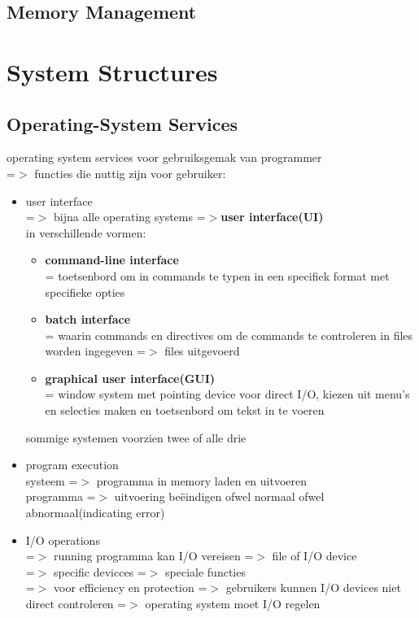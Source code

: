 \documentclass{report}
\begin{document}
\section{Memory Management}


\chapter{System Structures}
\section{Operating-System Services}
operating system services voor gebruiksgemak van programmer
\\=$>$ functies die nuttig zijn voor gebruiker:
\begin{itemize}
\item user interface
\\ =$>$ bijna alle operating systems =$>$\textbf{user interface(UI)}
\\in verschillende vormen:
\begin{itemize}
\item \textbf{command-line interface}
\\= toetsenbord om in commands te typen in een specifiek format met specifieke opties
\item \textbf{batch interface}
\\= waarin commands en directives om de commands te controleren in files worden ingegeven =$>$ files uitgevoerd
\item \textbf{graphical user interface(GUI)}
\\= window system met pointing device voor direct I/O, kiezen uit menu's en selecties maken en toetsenbord om tekst in te voeren
\end{itemize}
sommige systemen voorzien twee of alle drie
\item program execution
\\systeem =$>$ programma in memory laden en uitvoeren
\\programma =$>$ uitvoering be\"eindigen ofwel normaal ofwel abnormaal(indicating error)
\item I/O operations
\\=$>$ running programma kan I/O vereisen =$>$ file of I/O device
\\=$>$ specific devicces =$>$ speciale functies
\\=$>$ voor efficiency en protection =$>$ gebruikers kunnen I/O devices niet direct controleren =$>$ operating system moet I/O regelen

\end{itemize}
\end{document}
